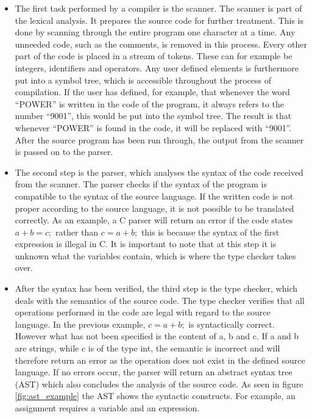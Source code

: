 \begin{itemize}
	\item The first task performed by a compiler is the scanner. The scanner is part of the lexical analysis. It prepares the source code for further treatment. This is done by scanning through the entire program one character at a time. Any unneeded code, such as the comments, is removed in this process. Every other part of the code is placed in a stream of tokens. These can for example be integers, identifiers and operators. Any user defined elements is furthermore put into a symbol tree, which is accessible throughout the process of compilation. If the user has defined, for example, that whenever the word ``POWER'' is written in the code of the program, it always refers to the number ``9001'', this would be put into the symbol tree. The result is that whenever ``POWER'' is found in the code, it will be replaced with ``9001''. After the source program has been run through, the output from the scanner is passed on to the parser.
	
	\item The second step is the parser, which analyses the syntax of the code received from the scanner. The parser checks if the syntax of the program is compatible to the syntax of the source language. If the written code is not proper according to the source language, it is not possible to be translated correctly. As an example, a C parser will return an error if the code states $a + b = c;$ rather than $c = a + b;$ this is because the syntax of the first expression is illegal in C. It is important to note that at this step it is unknown what the variables contain, which is where the type checker takes over.

	\item After the syntax has been verified, the third step is the type checker, which deals with the semantics of the source code. The type checker verifies that all operations performed in the code are legal with regard to the source language. In the previous example, $c = a + b;$ is syntactically correct. However what has not been specified is the content of a, b and c. If a and b are strings, while c is of the type int, the semantic is incorrect and will therefore return an error as the operation does not exist in the defined source language. If no errors occur, the parser will return an abstract syntax tree (AST) which also concludes the analysis of the source code. As seen in figure \ref{fig:ast_example} the AST shows the syntactic constructs. For example, an assignment requires a variable and an expression. 
	

\end{itemize}

